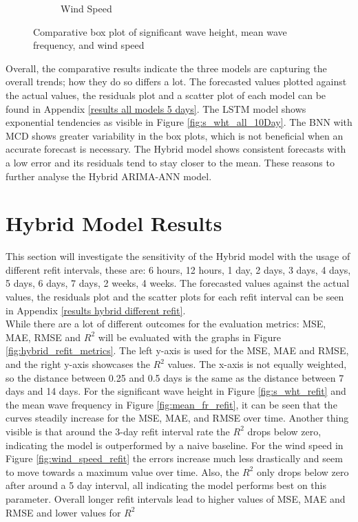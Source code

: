 \begin{figure}[ht!]
\begin{subfigure}[b]{0.49\textwidth}
        \caption{Wind Speed}
        \label{fig:wind_speed_box}
    \end{subfigure}
    \caption{Comparative box plot of significant wave height, mean wave frequency, and wind speed}
    \label{fig:combined_box}
\end{figure}

\noindent Overall, the comparative results indicate the three models are capturing the overall trends; how they do so differs a lot. The forecasted values plotted against the actual values, the residuals plot and a scatter plot of each model can be found in Appendix \ref{results all models 5 days}. The LSTM model shows exponential tendencies as visible in Figure \ref{fig:s_wht_all_10Day}. The BNN with MCD shows greater variability in the box plots, which is not beneficial when an accurate forecast is necessary. The Hybrid model shows consistent forecasts with a low error and its residuals tend to stay closer to the mean. These reasons to further analyse the Hybrid ARIMA-ANN model.

\newpage

\section{Hybrid Model Results}
\label{hybrid_model_results}
This section will investigate the sensitivity of the Hybrid model with the usage of different refit intervals, these are: 6 hours, 12 hours, 1 day, 2 days, 3 days, 4 days, 5 days, 6 days, 7 days, 2 weeks, 4 weeks. The forecasted values against the actual values, the residuals plot and the scatter plots for each refit interval can be seen in Appendix \ref{results hybrid different refit}.\\

\noindent While there are a lot of different outcomes for the evaluation metrics: MSE, MAE, RMSE and $R^2$ will be evaluated with the graphs in Figure \ref{fig:hybrid_refit_metrics}. The left y-axis is used for the MSE, MAE and RMSE, and the right y-axis showcases the $R^2$ values. The x-axis is not equally weighted, so the distance between 0.25 and 0.5 days is the same as the distance between 7 days and 14 days. For the significant wave height in Figure \ref{fig:s_wht_refit} and the mean wave frequency in Figure \ref{fig:mean_fr_refit}, it can be seen that the curves steadily increase for the MSE, MAE, and RMSE over time. Another thing visible is that around the 3-day refit interval rate the $R^2$ drops below zero, indicating the model is outperformed by a naive baseline. For the wind speed in Figure \ref{fig:wind_speed_refit} the errors increase much less drastically and seem to move towards a maximum value over time. Also, the $R^2$ only drops below zero after around a 5 day interval, all indicating the model performs best on this parameter. Overall longer refit intervals lead to higher values of MSE, MAE and RMSE and lower values for $R^2$

